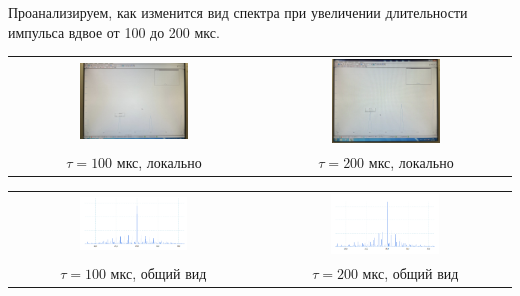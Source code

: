 \documentclass[a4paper]{article}
\theoremstyle{definition}
\theoremstyle{remark}
\begin{document}
Проанализируем, как изменится вид спектра при увеличении длительности импульса вдвое от 100 до 200 мкс.


\begin{center}
    \begin{tabular}{cc}
    \includegraphics[width=0.45\textwidth]{image/pic100loc.JPG}&\includegraphics[width=0.45\textwidth]{image/pic200loc.JPG}\\
    $\tau = 100$ мкс, локально & 
    $\tau = 200$ мкс, локально\\
    \end{tabular}
    \end{center}

    \begin{center}
        \begin{tabular}{cc}
        \includegraphics[width=0.45\textwidth]{image/pic100.png}&\includegraphics[width=0.45\textwidth]{image/pic200.png}\\
        $\tau = 100$ мкс, общий вид & 
        $\tau = 200$ мкс, общий вид\\
        \end{tabular}
        \end{center}
\end{document}
